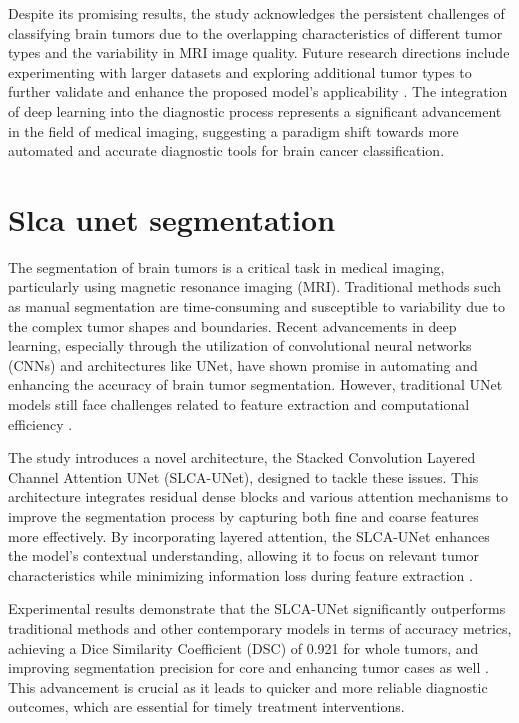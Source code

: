 \documentclass[runningheads]{llncs}
\begin{document}
Despite its promising results, the study acknowledges the persistent challenges of classifying brain tumors due to the overlapping characteristics of different tumor types and the variability in MRI image quality. Future research directions include experimenting with larger datasets and exploring additional tumor types to further validate and enhance the proposed model's applicability 	\cite{Sarah_2020}. The integration of deep learning into the diagnostic process represents a significant advancement in the field of medical imaging, suggesting a paradigm shift towards more automated and accurate diagnostic tools for brain cancer classification.
\section{Slca unet segmentation}
The segmentation of brain tumors is a critical task in medical imaging, particularly using magnetic resonance imaging (MRI). Traditional methods such as manual segmentation are time-consuming and susceptible to variability due to the complex tumor shapes and boundaries. Recent advancements in deep learning, especially through the utilization of convolutional neural networks (CNNs) and architectures like UNet, have shown promise in automating and enhancing the accuracy of brain tumor segmentation. However, traditional UNet models still face challenges related to feature extraction and computational efficiency 	\cite{P.S._2025}.

The study introduces a novel architecture, the Stacked Convolution Layered Channel Attention UNet (SLCA-UNet), designed to tackle these issues. This architecture integrates residual dense blocks and various attention mechanisms to improve the segmentation process by capturing both fine and coarse features more effectively. By incorporating layered attention, the SLCA-UNet enhances the model's contextual understanding, allowing it to focus on relevant tumor characteristics while minimizing information loss during feature extraction 	\cite{P.S._2025}. 

Experimental results demonstrate that the SLCA-UNet significantly outperforms traditional methods and other contemporary models in terms of accuracy metrics, achieving a Dice Similarity Coefficient (DSC) of 0.921 for whole tumors, and improving segmentation precision for core and enhancing tumor cases as well 	\cite{P.S._2025}. This advancement is crucial as it leads to quicker and more reliable diagnostic outcomes, which are essential for timely treatment interventions.
\end{document}
